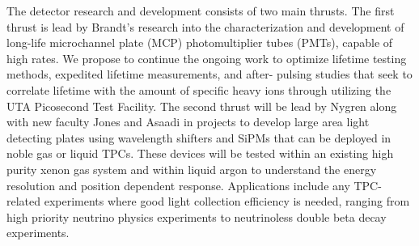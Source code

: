 The detector research and development consists of two main thrusts. The first thrust is lead by Brandt’s research into the characterization and development of long-life microchannel plate (MCP) photomultiplier tubes (PMTs), capable of high rates. We propose to continue the ongoing work to optimize lifetime testing methods, expedited lifetime measurements, and after- pulsing studies that seek to correlate lifetime with the amount of specific heavy ions through utilizing the UTA Picosecond Test Facility. The second thrust will be lead by Nygren along with new faculty Jones and Asaadi in projects to develop large area light detecting plates using wavelength shifters and SiPMs that can be deployed in noble gas or liquid TPCs. These devices will be tested within an existing high purity xenon gas system and within liquid argon to understand the energy resolution and position dependent response. Applications include any TPC-related experiments where good light collection efficiency is needed, ranging from high priority neutrino physics experiments to neutrinoless double beta decay experiments.
